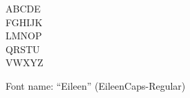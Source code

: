 \documentclass[a4paper]{article}
\begin{document}
\begin{center}
\fontsize{60pt}{72pt}
  ABCDE \\
  FGHIJK \\
  LMNOP \\
  QRSTU \\
  VWXYZ \\
\end{center}
\vfill
\begin{center}
Font name: ``Eileen'' (EileenCaps-Regular)
\end{center}
\end{document}
